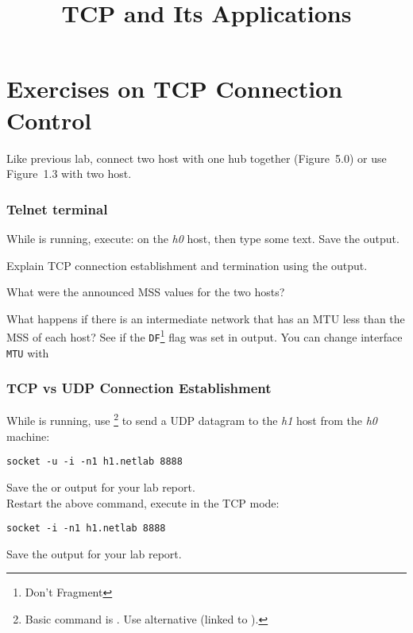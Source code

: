 \documentclass{../UTNetLab}
\title{TCP and Its Applications}
\begin{document}
\part{Exercises on TCP Connection Control}
    Like previous lab, connect two host with one hub together (Figure~5.0) or use Figure~1.3 with two host.

\section{Telnet terminal}
    While  is running, execute:  on the \textit{h0} host, then type some text.
    Save the  output.
    
    \begin{report}
        \item Explain TCP connection establishment and termination using the  output.
        
        \item What were the announced MSS values for the two hosts?
        
        \item What happens if there is an intermediate network that has an MTU less than the MSS of each host?
    See if the \texttt{DF}\footnote{Don't Fragment} flag was set in  output.
    You can change interface \texttt{MTU} with 
    \end{report}
    
\section{TCP vs UDP Connection Establishment}
    While  is running, use \footnote{Basic command is . Use alternative  (linked to ).} to send a UDP datagram to the \textit{h1} host from the \textit{h0} machine:
    \begin{lstlisting}[emph={h0,h1,netlab}]
socket -u -i -n1 h1.netlab 8888
    \end{lstlisting}
    {Save} the  or  output for your lab report. \\
    Restart the above  command, execute  in the TCP mode:
    \begin{lstlisting}[emph={h1,netlab}]
socket -i -n1 h1.netlab 8888
    \end{lstlisting}
    {Save} the  output for your lab report.
    
\end{document}

